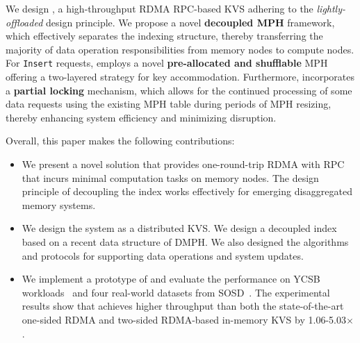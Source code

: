 We design \sys, a high-throughput RDMA RPC-based KVS adhering to the \textit{lightly-offloaded} design principle. We propose a novel \textbf{decoupled MPH} framework, which effectively separates the indexing structure, thereby transferring the majority of data operation responsibilities from memory nodes to compute nodes. For \texttt{Insert} requests, \sys employs a novel \textbf{pre-allocated and shufflable} MPH offering a two-layered strategy for key accommodation. Furthermore, \sys incorporates a \textbf{partial locking} mechanism, which allows for the continued processing of some data requests using the existing MPH table during periods of MPH resizing, thereby enhancing system efficiency and minimizing disruption.
\fi



Overall, this paper makes the following contributions:
\vspace{-1ex}
\begin{itemize}
    \item We present a novel solution that provides one-round-trip RDMA with RPC that incurs minimal computation tasks on memory nodes. The design principle of decoupling the index works effectively for emerging disaggregated memory systems.

    \item We design the \sys system as a distributed KVS. We design a decoupled index based on a recent data structure of DMPH. We also designed the algorithms and protocols for supporting data operations and system updates.
    
    \item We implement a prototype of \sys and evaluate the performance on YCSB workloads~\cite{ycsb} and four real-world datasets from SOSD~\cite{sosd}. The experimental results show that \sys achieves higher throughput than both the state-of-the-art one-sided RDMA and two-sided RDMA-based in-memory KVS by 1.06-5.03$\times$.
\end{itemize}









